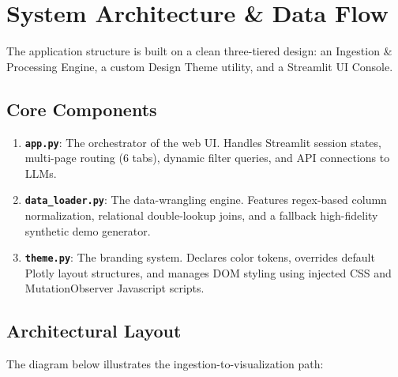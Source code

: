 \documentclass[11pt,a4paper]{article}
\begin{document}
\section{System Architecture \& Data Flow}
The application structure is built on a clean three-tiered design: an Ingestion \& Processing Engine, a custom Design Theme utility, and a Streamlit UI Console.

\subsection{Core Components}
\begin{enumerate}
    \item \textbf{\texttt{app.py}}: The orchestrator of the web UI. Handles Streamlit session states, multi-page routing (6 tabs), dynamic filter queries, and API connections to LLMs.
    \item \textbf{\texttt{data_loader.py}}: The data-wrangling engine. Features regex-based column normalization, relational double-lookup joins, and a fallback high-fidelity synthetic demo generator.
    \item \textbf{\texttt{theme.py}}: The branding system. Declares color tokens, overrides default Plotly layout structures, and manages DOM styling using injected CSS and MutationObserver Javascript scripts.
\end{enumerate}

\subsection{Architectural Layout}
The diagram below illustrates the ingestion-to-visualization path:
\end{document}

